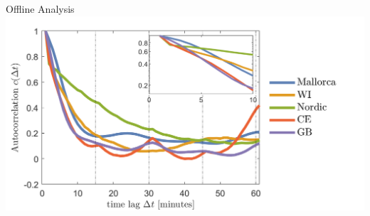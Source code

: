 \begin{frame}{Offline Analysis}
	\includegraphics[scale=0.35]{../figures/comp.png}
\end{frame}

%		

